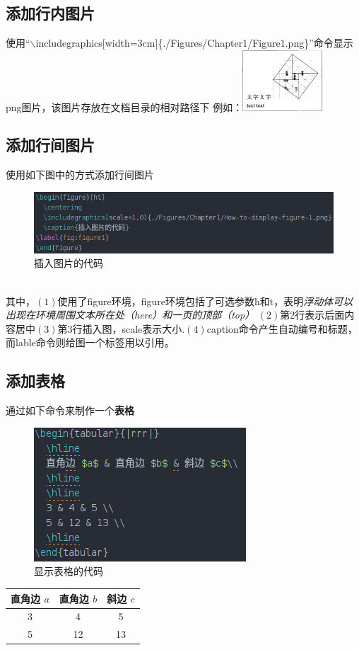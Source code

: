 \documentclass[UTF8]{ctexbook}
\begin{document}
\subsection{添加行内图片}
使用“$\backslash$includegraphics$[$width=3cm$]$\{./Figures/Chapter1/Figure1.png\}”命令显示png图片，该图片存放在文档目录的相对路径下
例如：\includegraphics[width=3cm]{./Figures/Chapter1/Figure1.png}

\subsection{添加行间图片}
使用如下图中的方式添加行间图片
\begin{figure}[ht]
  \centering
  \includegraphics[scale=0.8]{./Figures/Chapter1/How-to-display-figure-1.png}
  \caption{插入图片的代码}
\label{fig:figure1}
\end{figure}
\\
其中，$(1)$使用了figure环境，figure环境包括了可选参数h和t，表明\emph{浮动体可以出现在环境周围文本所在处（here）和一页的顶部（top）}
$(2)$第2行表示后面内容居中$(3)$第3行插入图，scale表示大小.$(4)$caption命令产生自动编号和标题，而lable命令则给图一个标签用以引用。
\newpage
\subsection{添加表格}
通过如下命令来制作一个\textbf{表格}\newline
\begin{figure}[ht]
  \centering
  \includegraphics[scale=0.8]{./Figures/Chapter1/How-to-display-table-1.png}
  \caption{显示表格的代码}
\label{fig:table1}
\end{figure}
\newline
\begin{tabular}{|ccc|}
  \centering
  \hline
  直角边 $a$ & 直角边 $b$ & 斜边 $c$\\
  \hline
  3 & 4 & 5 \\
  5 & 12 & 13 \\
  \hline

\end{tabular}
\end{document}
